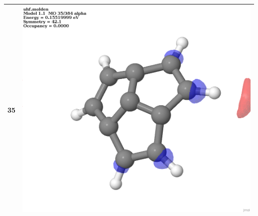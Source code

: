 \documentclass{article}
\begin{document}
\begin{tabular}{|c|c|}
35 & \includegraphics[scale=0.1]{M1T_35.png}\\ \hline
\end{tabular}
\end{document}
